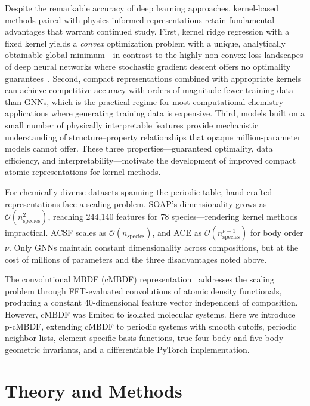 \documentclass[twocolumn]{article}
\begin{document}
Despite the remarkable accuracy of deep learning approaches, kernel-based methods paired with physics-informed representations retain fundamental advantages that warrant continued study.
First, kernel ridge regression with a fixed kernel yields a \textit{convex} optimization problem with a unique, analytically obtainable global minimum---in contrast to the highly non-convex loss landscapes of deep neural networks where stochastic gradient descent offers no optimality guarantees~\cite{vonlilienfeld2020}.
Second, compact representations combined with appropriate kernels can achieve competitive accuracy with orders of magnitude fewer training data than GNNs, which is the practical regime for most computational chemistry applications where generating training data is expensive.
Third, models built on a small number of physically interpretable features provide mechanistic understanding of structure--property relationships that opaque million-parameter models cannot offer.
These three properties---guaranteed optimality, data efficiency, and interpretability---motivate the development of improved compact atomic representations for kernel methods.

For chemically diverse datasets spanning the periodic table, hand-crafted representations face a scaling problem.
SOAP's dimensionality grows as $\mathcal{O}(n_\text{species}^2)$, reaching 244,140 features for 78 species---rendering kernel methods impractical.
ACSF scales as $\mathcal{O}(n_\text{species})$, and ACE as $\mathcal{O}(n_\text{species}^{\nu-1})$ for body order $\nu$.
Only GNNs maintain constant dimensionality across compositions, but at the cost of millions of parameters and the three disadvantages noted above.

The convolutional MBDF (cMBDF) representation~\cite{khan2025} addresses the scaling problem through FFT-evaluated convolutions of atomic density functionals, producing a constant 40-dimensional feature vector independent of composition.
However, cMBDF was limited to isolated molecular systems.
Here we introduce p-cMBDF, extending cMBDF to periodic systems with smooth cutoffs, periodic neighbor lists, element-specific basis functions, true four-body and five-body geometric invariants, and a differentiable PyTorch implementation.

\section{Theory and Methods}
\end{document}
